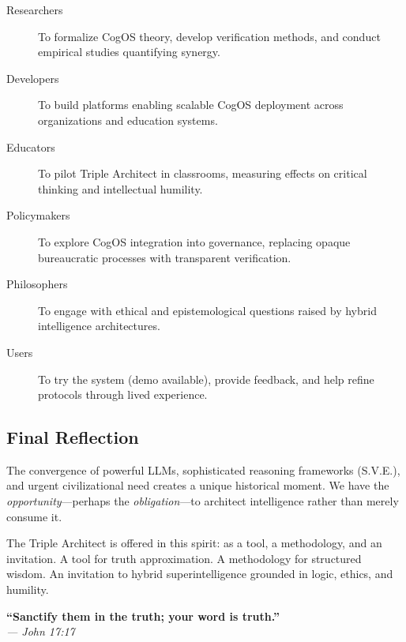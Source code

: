\documentclass[11pt,a4paper]{article}
\theoremstyle{definition}
\theoremstyle{remark}
\begin{document}
\begin{description}
    \item[Researchers] To formalize CogOS theory, develop verification methods, and conduct empirical studies quantifying synergy.
    
    \item[Developers] To build platforms enabling scalable CogOS deployment across organizations and education systems.
    
    \item[Educators] To pilot Triple Architect in classrooms, measuring effects on critical thinking and intellectual humility.
    
    \item[Policymakers] To explore CogOS integration into governance, replacing opaque bureaucratic processes with transparent verification.
    
    \item[Philosophers] To engage with ethical and epistemological questions raised by hybrid intelligence architectures.
    
    \item[Users] To try the system (demo available), provide feedback, and help refine protocols through lived experience.
\end{description}

\subsection{Final Reflection}

The convergence of powerful LLMs, sophisticated reasoning frameworks (S.V.E.), and urgent civilizational need creates a unique historical moment. We have the \textit{opportunity}—perhaps the \textit{obligation}—to architect intelligence rather than merely consume it.

The Triple Architect is offered in this spirit: as a tool, a methodology, and an invitation. A tool for truth approximation. A methodology for structured wisdom. An invitation to hybrid superintelligence grounded in logic, ethics, and humility.

\bigskip

\begin{center}
\Large
\textbf{``Sanctify them in the truth; your word is truth.''}\\
\normalsize
\textit{— John 17:17}
\end{center}

\vspace{1em}
\end{document}

